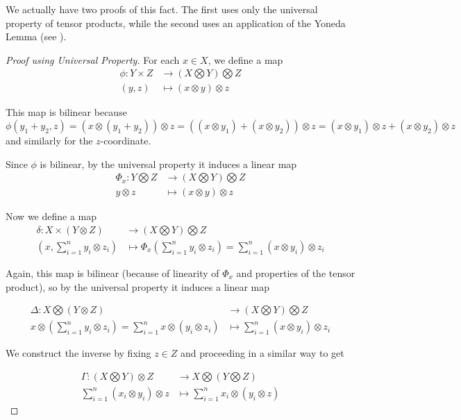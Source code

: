 \documentclass[11pt]{article}
\theoremstyle{definition}
\theoremstyle{plain}
\theoremstyle{plain}
\theoremstyle{plain}
\theoremstyle{definition}
\begin{document}
We actually have two proofs of this fact. The first uses only the universal property of tensor products, while the second uses an application of the Yoneda Lemma (see \cite{liu_yoneda_2018}).

\begin{proof}[Proof using Universal Property]
For each $x \in X$, we define a map
\begin{align*}
\phi: Y \times Z &\to (X \bigotimes Y) \bigotimes Z \\
(y, z) &\mapsto (x \otimes y) \otimes z
\end{align*}

This map is bilinear because $\phi(y_1 + y_2, z) = (x \otimes (y_1 + y_2)) \otimes z = ((x \otimes y_1) + (x \otimes y_2)) \otimes z = (x \otimes y_1) \otimes z + (x \otimes y_2) \otimes z$ and similarly for the $z$-coordinate.

Since $\phi$ is bilinear, by the universal property it induces a linear map
\begin{align*}
\Phi_x: Y \bigotimes Z &\to (X \bigotimes Y) \bigotimes Z \\
y \otimes z &\mapsto (x \otimes y) \otimes z
\end{align*}

Now we define a map
\begin{align*}
\delta: X \times (Y \otimes Z) &\to (X \bigotimes Y) \bigotimes Z \\
(x, \sum\limits_{i=1}^{n}y_i \otimes z_i) &\mapsto \Phi_x(\sum\limits_{i=1}^{n}y_i \otimes z_i) = \sum\limits_{i=1}^{n}(x \otimes y_i) \otimes z_i
\end{align*}

Again, this map is bilinear (because of linearity of $\Phi_x$ and properties of the tensor product), so by the universal property it induces a linear map

\begin{align*}
\Delta: X \bigotimes (Y \otimes Z) &\to (X \bigotimes Y) \bigotimes Z \\
x \otimes (\sum\limits_{i=1}^{n}y_i \otimes z_i) = \sum\limits_{i=1}^{n}x \otimes (y_i \otimes z_i) &\mapsto \sum\limits_{i=1}^{n}(x \otimes y_i) \otimes z_i
\end{align*}

We construct the inverse by fixing $z \in Z$ and proceeding in a similar way to get

\begin{align*}
\Gamma: (X \bigotimes Y) \otimes Z &\to X \bigotimes (Y \bigotimes Z) \\
\sum\limits_{i=1}^{n}(x_i \otimes y_i) \otimes z &\mapsto \sum\limits_{i=1}^{n}x_i \otimes (y_i \otimes z)
\end{align*}


\end{proof}
\end{document}
